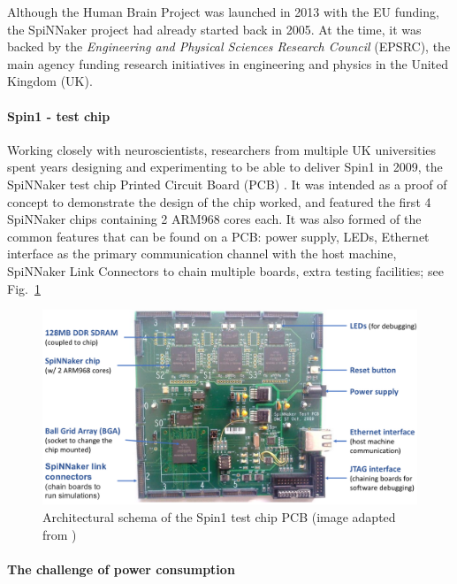 Although the Human Brain Project \cite{hbp} was launched in 2013 with the EU funding, the SpiNNaker project had already started back in 2005. At the time, it was backed by the \textit{Engineering and Physical Sciences Research Council} (EPSRC), the main agency funding research initiatives in engineering and physics in the United Kingdom (UK). \\

\paragraph{Spin1 - test chip}

Working closely with neuroscientists, researchers from multiple UK universities spent years designing and experimenting to be able to deliver Spin1 in 2009, the SpiNNaker test chip Printed Circuit Board (PCB) \cite{dev-process}. It was intended as a proof of concept to demonstrate the design of the chip worked, and featured the first 4 SpiNNaker chips containing 2 ARM968 cores each. It was also formed of the common features that can be found on a PCB: power supply, LEDs, Ethernet interface as the primary communication channel with the host machine, SpiNNaker Link Connectors to chain multiple boards, extra testing facilities; see Fig.~\ref{fig:spin1} \\

\begin{figure}[!ht]
\centering
\includegraphics[width=\textwidth]{figures/spin1-schema.png}
\caption{Architectural schema of the Spin1 test chip PCB (image adapted from \cite{dev-process})}
\label{fig:spin1}
\end{figure} 


\paragraph{The challenge of power consumption}

